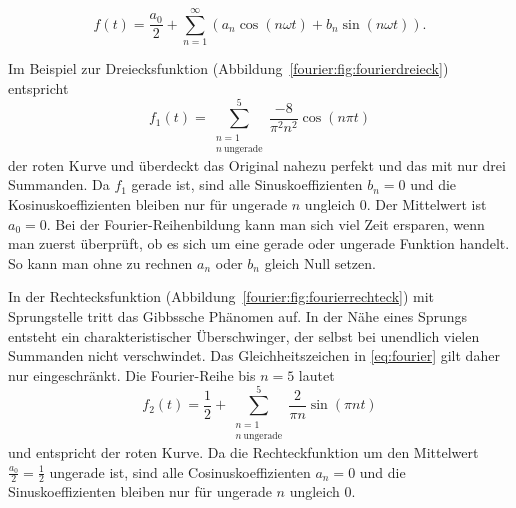 \begin{equation}\label{eq:fourier}
f(t) = \frac{a_0}{2} + \sum_{n=1}^{\infty} \left( a_n \cos\left( n\omega t \right) + b_n \sin\left( n \omega t \right) \right).
\end{equation}



\begin{beispiel}



Im Beispiel zur Dreiecksfunktion (Abbildung~\ref{fourier:fig:fourierdreieck}) entspricht  
\begin{equation}
	f_1(t) = \sum_{\substack{n=1 \\ n\ \text{ungerade}}}^{5} \frac{-8}{\pi^2 n^2} \cos(n\pi t)
\end{equation}
der roten Kurve und überdeckt das Original nahezu perfekt und das mit nur drei Summanden.  
Da $f_1$ gerade ist, sind alle Sinuskoeffizienten $b_n=0$ und die Kosinuskoeffizienten bleiben nur für ungerade $n$ ungleich $0$.  
Der Mittelwert ist $a_0=0$.  
Bei der Fourier-Reihenbildung kann man sich viel Zeit ersparen, wenn man zuerst überprüft, ob es sich um eine gerade oder ungerade Funktion handelt.
So kann man ohne zu rechnen $a_n$ oder $b_n$ gleich Null setzen.
\end{beispiel}



\begin{beispiel}



In der Rechtecksfunktion (Abbildung~\ref{fourier:fig:fourierrechteck}) mit Sprungstelle tritt das Gibbssche Phänomen auf.  
In der Nähe eines Sprungs entsteht ein charakteristischer Überschwinger, der selbst bei unendlich vielen Summanden nicht verschwindet.
Das Gleichheitszeichen in \eqref{eq:fourier} gilt daher nur eingeschränkt.  
Die Fourier-Reihe bis $n=5$ lautet
\begin{equation}
	f_2(t) = \frac{1}{2} + \sum_{\substack{n=1 \\ n\ \text{ungerade}}}^{5} \frac{2}{\pi n} \sin\left( \pi n t \right)
\end{equation}
und entspricht der roten Kurve.  
Da die Rechteckfunktion um den Mittelwert $\frac{a_0}{2}=\frac{1}{2}$ ungerade ist, sind alle Cosinuskoeffizienten $a_n=0$ und die Sinuskoeffizienten bleiben nur für ungerade $n$ ungleich $0$.  

\end{beispiel}






